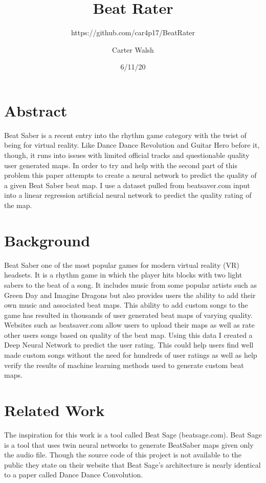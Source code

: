 \documentclass[12pt]{scrartcl}
\title{Beat Rater}
\author{
	Carter Walsh
}
\subtitle{https://github.com/car4p17/BeatRater}
\date{6/11/20}
\begin{document}
	\maketitle
	\section{Abstract}
	Beat Saber is a recent entry into the rhythm game category with the twist of being for virtual reality. Like Dance Dance Revolution and Guitar Hero before it, though, it runs into issues with limited official tracks and questionable quality user generated maps. In order to try and help with the second part of this problem this paper attempts to create a neural network to predict the quality of a given Beat Saber beat map. I use a dataset pulled from beatsaver.com input into a linear regression artificial neural network to predict the quality rating of the map. 
	
	\section{Background}
	Beat Saber one of the most popular games for modern virtual reality (VR) headsets. It is a rhythm game in which the player hits blocks with two light sabers to the beat of a song. It includes music from some popular artists such as Green Day and Imagine Dragons but also provides users the ability to add their own music and associated beat maps. This ability to add custom songs to the game has resulted in thousands of user generated beat maps of varying quality. Websites such as beatsaver.com allow users to upload their maps as well as rate other users songs based on quality of the beat map. Using this data I created a Deep Neural Network to predict the user rating. This could help users find well made custom songs without the need for hundreds of user ratings as well as help verify the results of machine learning methods used to generate custom beat maps.
	
	\section{Related Work}
	The inspiration for this work is a tool called Beat Sage (beatsage.com). Beat Sage is a tool that uses twin neural networks to generate BeatSaber maps given only the audio file. Though the source code of this project is not available to the public they state on their website that Beat Sage’s architecture is nearly identical to a paper called Dance Dance Convolution.\\
	
\end{document}
